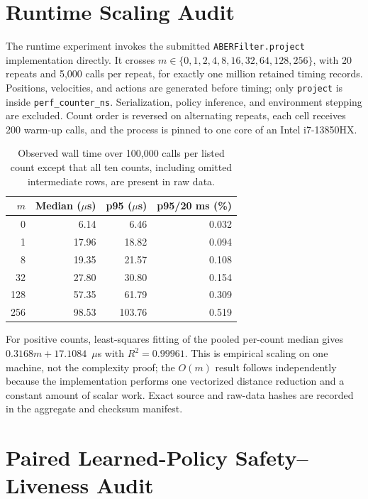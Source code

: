 \documentclass[letterpaper]{article}
\begin{document}
\section{Runtime Scaling Audit}

The runtime experiment invokes the submitted \texttt{ABERFilter.project}
implementation directly.  It crosses
$m\in\{0,1,2,4,8,16,32,64,128,256\}$, with 20 repeats and 5,000 calls per
repeat, for exactly one million retained timing records.  Positions,
velocities, and actions are generated before timing; only \texttt{project} is
inside \texttt{perf\_counter\_ns}.  Serialization, policy inference, and
environment stepping are excluded.  Count order is reversed on alternating
repeats, each cell receives 200 warm-up calls, and the process is pinned to one
core of an Intel i7-13850HX.

\begin{table}[t]
\centering
\small
\setlength{\tabcolsep}{5pt}
\begin{tabular}{rrrr}
\toprule
$m$ & Median ($\mu$s) & p95 ($\mu$s) & p95/20 ms (\%)\\
\midrule
0 & 6.14 & 6.46 & 0.032\\
1 & 17.96 & 18.82 & 0.094\\
8 & 19.35 & 21.57 & 0.108\\
32 & 27.80 & 30.80 & 0.154\\
128 & 57.35 & 61.79 & 0.309\\
256 & 98.53 & 103.76 & 0.519\\
\bottomrule
\end{tabular}
\caption{Observed wall time over 100,000 calls per listed count except that
all ten counts, including omitted intermediate rows, are present in raw data.}
\label{tab:runtimesupp}
\end{table}

For positive counts, least-squares fitting of the pooled per-count median gives
$0.3168m+17.1084$~$\mu$s with $R^2=0.99961$.  This is empirical scaling on
one machine, not the complexity proof; the $O(m)$ result follows independently
because the implementation performs one vectorized distance reduction and a
constant amount of scalar work.  Exact source and raw-data hashes are recorded
in the aggregate and checksum manifest.

\section{Paired Learned-Policy Safety--Liveness Audit}
\end{document}

